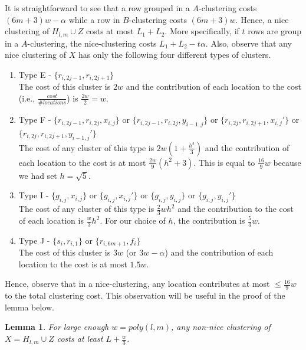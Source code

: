 \documentclass[letterpaper,12pt,titlepage,oneside,final]{book}
\newtheorem{lemma}{Lemma}
\begin{document}
It is straightforward to see that a row grouped in a $A$-clustering costs $(6m+3)w-\alpha$ while a row in $B$-clustering costs $(6m+3)w$. Hence, a nice clustering of $H_{l,m} \cup Z$ costs at most $L_1 + L_2$. More specifically, if $t$ rows are group in a $A$-clustering, the nice-clustering costs $L_1+L_2-t\alpha$. Also, observe that any nice clustering of $X$ has only the following four different types of clusters. \begin{enumerate}[label=(\arabic*),nolistsep,leftmargin=*]
\item Type E - $\{r_{i,2j-1}, r_{i,2j+1}\}$ \\
The cost of this cluster is $2w$ and the contribution of each location to the cost (i.e., $\frac{cost}{\#locations}$) is $ \frac{2w}{2} = w$.
\item Type F - $\{r_{i,2j-1}, r_{i, 2j}, x_{i, j}\}$ or $\{r_{i,2j-1}, r_{i, 2j}, y_{i-1, j}\}$ or $\{r_{i,2j}, r_{i, 2j+1}, x_{i, j}'\}$ or $\{r_{i,2j}, r_{i, 2j+1}, y_{i-1, j}'\}$\\
The cost of any cluster of this type is $2w(1+\frac{h^2}{3})$ and the contribution of each location to the cost is at most $\frac{2w}{9}(h^2+3)$. This is equal to $\frac{16}{9}w$ because we had set $h = \sqrt 5$.
\item Type I - $\{g_{i, j}, x_{i,j}\}$ or $\{g_{i, j}, x_{i,j}'\}$  or $\{g_{i, j}, y_{i,j}\}$  or $\{g_{i, j}, y_{i,j}'\}$\\
The cost of any cluster of this type is $\frac{2}{3}wh^2$ and the contribution to the cost of each location is $\frac{w}{3}h^2$. For our choice of $h$, the contribution is $\frac{5}{3}w$.
\item Type J - $\{s_i, r_{i,1}\}$ or $\{r_{i,6m+1}, f_i\}$\\
The cost of this cluster is $3w$ (or $3w-\alpha$) and the contribution of each location to the cost is at most $1.5w$. 
\end{enumerate}
Hence, observe that in a nice-clustering, any location contributes at most $\le \frac{16}{9}w$ to the total clustering cost. This observation will be useful in the proof of the lemma below.

\begin{lemma}
\label{lemma:costNonNice}
For large enough $w = poly(l, m)$, any non-nice clustering of $X = H_{l, m} \cup Z$ costs at least $L + \frac{w}{3}$.
\end{lemma}
\end{document}
